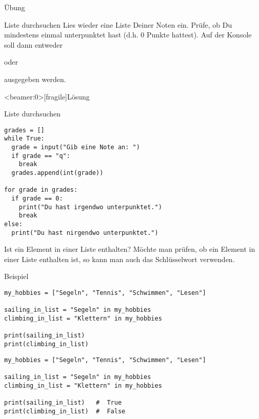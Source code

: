 \begin{frame}{Übung}

\begin{block}{Liste durchsuchen}
	\vspace{2pt}
Lies wieder eine Liste Deiner Noten ein. Prüfe, ob Du mindestens einmal unterpunktet hast (d.h. 0 Punkte hattest). 
Auf der Konsole soll dann entweder 


oder 


ausgegeben werden. 
\end{block}
\end{frame}


\begin{frame}<beamer:0>[fragile]{Lösung}
\begin{solutionblock}{Liste durchsuchen}
\begin{verbatim}
grades = []
while True:
  grade = input("Gib eine Note an: ")
  if grade == "q":
    break
  grades.append(int(grade))

for grade in grades:
  if grade == 0:
    print("Du hast irgendwo unterpunktet.")
    break
else: 
  print("Du hast nirgendwo unterpunktet.")
\end{verbatim}
\end{solutionblock}
\end{frame}

\begin{fragile}

\begin{block}{Ist ein Element in einer Liste enthalten?}
\vspace{2pt}	
Möchte man prüfen, ob ein Element in einer Liste enthalten ist, so kann man auch das Schlüsselwort  verwenden. 
\end{block}

\pause 
\vspace{12pt}

\begin{exampleblock}{Beispiel}
\vspace{2pt}
\begin{overprint}
\begin{verbatim}
my_hobbies = ["Segeln", "Tennis", "Schwimmen", "Lesen"]

sailing_in_list = "Segeln" in my_hobbies
climbing_in_list = "Klettern" in my_hobbies

print(sailing_in_list)  
print(climbing_in_list)
\end{verbatim}
\begin{verbatim}
my_hobbies = ["Segeln", "Tennis", "Schwimmen", "Lesen"]

sailing_in_list = "Segeln" in my_hobbies
climbing_in_list = "Klettern" in my_hobbies

print(sailing_in_list)   #  True
print(climbing_in_list)  #  False
\end{verbatim}
\end{overprint}

\end{exampleblock}
\end{fragile}


